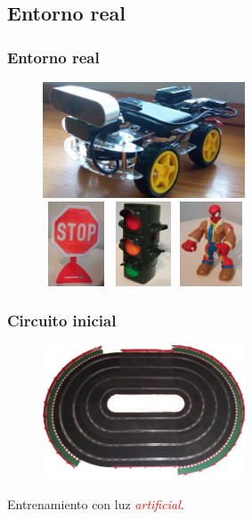 \documentclass{beamer}
\begin{document}
\subsection{Entorno real}
\begin{frame}
	\frametitle{Entorno real}
	\begin{figure}
		\centering
		\includegraphics[width=6cm]{figs/robot}\vspace{0.5cm}\\
		\includegraphics[width=2cm, height=2.5cm]{figs/realstopsign}\hspace{0.7cm}\includegraphics[width=2cm,
			height=2.5cm]{figs/realtrafficlight}\hspace{0.7cm}\includegraphics[width=2cm, height=2.5cm]{figs/realpedestrian}
	\end{figure}
\end{frame}

\begin{frame}
	\frametitle{Circuito inicial}
	\begin{figure}
		\centering
		\includegraphics[width=6cm]{figs/circuit}
	\end{figure}
	\begin{outline}
		\1 Entrenamiento con luz \textcolor{red}{\textit{artificial}}.
	\end{outline}
\end{frame}
\end{document}
